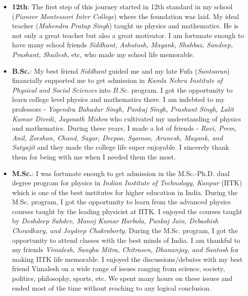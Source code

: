 \begin{itemize} [leftmargin=*]
\item \textbf{12th}:
The first step of this journey started in 12th standard in my school (\textit{Pioneer Montessori Inter College}) where the foundation was laid. My ideal teacher (\textit{Mahendra Pratap Singh}) taught us physics and mathematics. He is not only a great teacher but also a great motivator. I am fortunate enough to have many school friends \textit{Siddhant, Ashutosh, Mayank, Shahbaz, Sandeep, Prashant, Shailesh}, etc, who made my school life memorable.

\item \textbf{B.Sc.}:
My best friend \textit{Siddhant} guided me and my late Fufa 
(\textit{Santsaran}) financially supported me to get admission in \textit{Kamla 
Nehru Institute of Physical and Social Sciences} into $B.Sc.$ program. I got the opportunity to learn college level physics and mathematics there. I am indebted to my professors - \textit{
Yogendra Bahadur Singh, Pankaj Singh, Prashant Singh, Lalit Kumar Divedi, Jaysnath 
Mishra} who cultivated my understanding of physics and mathematics. During these 
years, I made a lot of friends - \textit{Ravi, Prem, Anil,
Zeeshan, Chand, Sagar, Deepoo, Syamoo, Arunesh, Mayank, and Satyajit} and they made 
the college life super enjoyable. I sincerely thank them for being with me when
I needed them the most.

\item \textbf{M.Sc.}:
I was fortunate enough to get admission in the M.Sc.-Ph.D. dual degree 
program for physics in \textit{Indian Institute of Technology, Kanpur} (IITK) 
which is one of the best institutes for higher education in India. During the
M.Sc. program, I got the opportunity to learn from the advanced physics courses taught by the leading physicist at IITK. I enjoyed the courses taught by \textit{
Deshdeep Sahdev, Manoj Kumar Harbola, Pankaj Jain, Debashish Chowdhury, and Joydeep Chakraborty}. During the M.Sc. program, I got the opportunity to attend classes with the best minds of India. I am thankful to my friends \textit{Vimalesh, Sangha Mitra, Chitrasen, Dhananjay, and Santosh} for making
IITK life memorable. I enjoyed the discussions/debates with my best friend
Vimalesh on a wide range of issues ranging from science, society, politics, 
philosophy, sports, etc. We spent many hours on these issues and ended most of
the time without reaching to any logical conclusion. 


\end{itemize}
